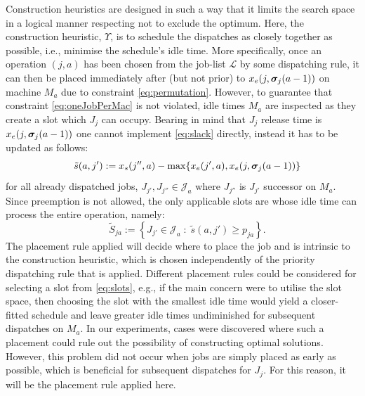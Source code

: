 \documentclass[twocolumn]{svjour3}
\begin{document}
Construction heuristics are designed in such a way that it limits the search 
space in a logical manner respecting not to exclude the optimum. Here, the 
construction heuristic, $\Upsilon$, is to schedule the dispatches as closely 
together as possible, i.e., minimise the schedule's idle time. 
More specifically, once an operation $(j,a)$ has been chosen from the job-list 
$\mathcal{L}$ by some dispatching rule, it can then be placed immediately after 
(but not prior) to $x_e(j,\bm \sigma_j(a-1))$ on machine $M_a$ due to constraint 
\cref{eq:permutation}. 
However, to guarantee that constraint \cref{eq:oneJobPerMac} is not violated, 
idle times $M_a$ are inspected as they create a slot which $J_j$ can 
occupy. Bearing in mind that $J_j$ release time is $x_e(j,\bm \sigma_j(a-1))$ one 
cannot implement \cref{eq:slack} directly, instead it has to be updated as 
follows:
\begin{equation}\quad
\tilde{s}(a,j'):= x_s(j'',a)-\max\{x_e(j',a),x_e(j,\vsigma_j(a-1))\} %
\end{equation}
for all already dispatched jobs, $J_{j'},J_{j''}\in \mathcal{J}_a$ where 
$J_{j''}$ is $J_{j'}$ successor on $M_a$. Since preemption is not allowed, the 
only applicable slots are whose idle time can process the entire operation, 
namely:
\begin{equation}\quad
\tilde{S}_{ja} := \left\{J_{j'}\in \mathcal{J}_a \;:\; \tilde{s}(a,j')\geq p_{ja} 
\right\}\label{eq:slots}.
\end{equation} 
The placement rule applied will decide where to place the job and is intrinsic 
to the construction heuristic, which is chosen independently of the priority 
dispatching rule that is applied. 
Different placement rules could be considered for selecting a slot from 
\cref{eq:slots}, e.g., if the main concern were to utilise the slot space, then 
choosing the slot with the smallest idle time would yield a closer-fitted 
schedule and leave greater idle times undiminished for subsequent dispatches 
on $M_a$.
In our experiments, cases were discovered where such a placement could rule out 
the possibility of constructing optimal solutions.
However, this problem did not occur when jobs are simply placed as early as 
possible, which is beneficial for subsequent dispatches for $J_j$. 
For this reason, it will be the placement rule applied here.
\end{document}
